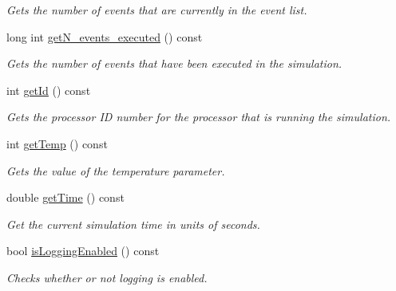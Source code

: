 \begin{DoxyCompactItemize}
\begin{DoxyCompactList}\small\item\em Gets the number of events that are currently in the event list. \end{DoxyCompactList}\item 
\mbox{\label{class_simulation_a52cb5564151421cbefaca56357738de7}} 
long int \hyperlink{class_simulation_a52cb5564151421cbefaca56357738de7}{get\+N\+\_\+events\+\_\+executed} () const
\begin{DoxyCompactList}\small\item\em Gets the number of events that have been executed in the simulation. \end{DoxyCompactList}\item 
int \hyperlink{class_simulation_aff40f268758bd9a0f390a649fc45c05e}{get\+Id} () const
\begin{DoxyCompactList}\small\item\em Gets the processor ID number for the processor that is running the simulation. \end{DoxyCompactList}\item 
\mbox{\label{class_simulation_ac00bce7c792fb67a75395c46c03efe0a}} 
int \hyperlink{class_simulation_ac00bce7c792fb67a75395c46c03efe0a}{get\+Temp} () const
\begin{DoxyCompactList}\small\item\em Gets the value of the temperature parameter. \end{DoxyCompactList}\item 
\mbox{\label{class_simulation_a391ac262089c8bda8e76ce930b1db88b}} 
double \hyperlink{class_simulation_a391ac262089c8bda8e76ce930b1db88b}{get\+Time} () const
\begin{DoxyCompactList}\small\item\em Get the current simulation time in units of seconds. \end{DoxyCompactList}\item 
bool \hyperlink{class_simulation_ac7c8a49a4cc506b850891480e0aae512}{is\+Logging\+Enabled} () const
\begin{DoxyCompactList}\small\item\em Checks whether or not logging is enabled. \end{DoxyCompactList}\item 
\mbox{\label{class_simulation_a938de951b2766c6fb2b00cf9714caffa}} 

\end{DoxyCompactItemize}
